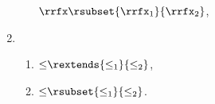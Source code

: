 \begin{figure}
\begin{multicols}{2}
\begin{enumerate}[topsep=0pt,label=(\textsc{c}\arabic*),ref=\textsc{c}\arabic*]
\begin{enumerate}[leftmargin=0pt]
        ${\rrfx}\rsubset{\rrfx_1}{\rrfx_2}$,
      \end{enumerate}
    \item[] 
      \begin{enumerate}[leftmargin=0pt]
      \item \label{if-le-extends}
        ${\le}\rextends{\le_1}{\le_2}$,
      \item \label{if-le-subset}
        ${\le}\rsubset{\le_1}{\le_2}$.
      \end{enumerate}
    \end{enumerate}
  \end{multicols}
  \medskip


\end{figure}
